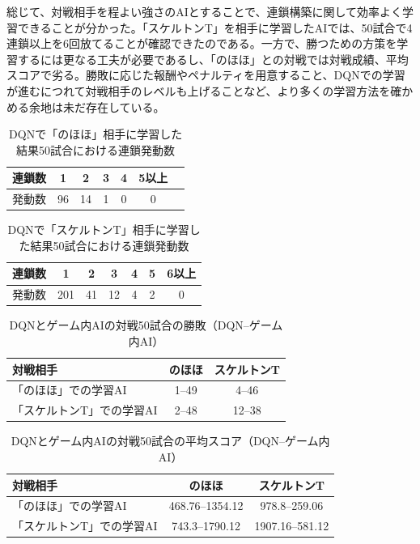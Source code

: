 \documentclass[12pt]{jarticle}
\begin{document}
総じて、対戦相手を程よい強さのAIとすることで、連鎖構築に関して効率よく学習できることが分かった。「スケルトンT」を相手に学習したAIでは、50試合で4連鎖以上を6回放てることが確認できたのである。一方で、勝つための方策を学習するには更なる工夫が必要であるし、「のほほ」との対戦では対戦成績、平均スコアで劣る。勝敗に応じた報酬やペナルティを用意すること、DQNでの学習が進むにつれて対戦相手のレベルも上げることなど、より多くの学習方法を確かめる余地は未だ存在している。


\begin{table}[htb]
\begin{center}
\caption{DQNで「のほほ」相手に学習した結果50試合における連鎖発動数} \label{tab:dqn_chain_nohoho}
\begin{tabular}{|l|c|c|c|c|c|c|} \hline
連鎖数 & 1 & 2 & 3 & 4 & 5以上\\ \hline
発動数 & 96 & 14 & 1 & 0 & 0\\ \hline
\end{tabular}
\end{center}
\end{table}

\begin{table}[htb]
\begin{center}
\caption{DQNで「スケルトンT」相手に学習した結果50試合における連鎖発動数} \label{tab:dqn_chain_sket}
\begin{tabular}{|l|c|c|c|c|c|c|} \hline
連鎖数 & 1 & 2 & 3 & 4 & 5 & 6以上\\ \hline
発動数 & 201 & 41 & 12 & 4 & 2 & 0\\ \hline
\end{tabular}
\end{center}
\end{table}


\begin{table}[htb]
\begin{center}
\caption{DQNとゲーム内AIの対戦50試合の勝敗（DQN--ゲーム内AI）} \label{tab:dqn_win_vs}
\begin{tabular}{|l|c|c|} \hline
対戦相手 & のほほ & スケルトンT\\ \hline
「のほほ」での学習AI & 1--49 & 4--46\\ \hline
「スケルトンT」での学習AI & 2--48 & 12--38\\ \hline
\end{tabular}
\end{center}
\end{table}

\begin{table}[htb]
\begin{center}
\caption{DQNとゲーム内AIの対戦50試合の平均スコア（DQN--ゲーム内AI）} \label{tab:dqn_score_vs}
\begin{tabular}{|l|c|c|} \hline
対戦相手 & のほほ & スケルトンT\\ \hline
「のほほ」での学習AI & 468.76--1354.12 & 978.8--259.06\\ \hline
「スケルトンT」での学習AI & 743.3--1790.12 & 1907.16--581.12\\ \hline
\end{tabular}
\end{center}
\end{table}
\end{document}
